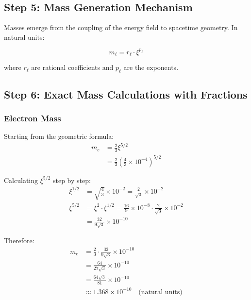 \documentclass[12pt,a4paper]{article}
\newcommand{\xipar}{\xi}  %
\begin{document}
	\subsection{Step 5: Mass Generation Mechanism}
	
	Masses emerge from the coupling of the energy field to spacetime geometry. In natural units:
	
	\begin{equation}
		m_{\ell} = r_{\ell} \cdot \xipar^{p_{\ell}}
	\end{equation}
	
	where $r_{\ell}$ are rational coefficients and $p_{\ell}$ are the exponents.
	
	\subsection{Step 6: Exact Mass Calculations with Fractions}
	
	\subsubsection{Electron Mass}
	
	\begin{keyresult}
		Starting from the geometric formula:
		\begin{align}
			m_e &= \frac{2}{3} \xipar^{5/2} \\
			&= \frac{2}{3} \left(\frac{4}{3} \times 10^{-4}\right)^{5/2}
		\end{align}
		
		Calculating $\xipar^{5/2}$ step by step:
		\begin{align}
			\xipar^{1/2} &= \sqrt{\frac{4}{3}} \times 10^{-2} = \frac{2}{\sqrt{3}} \times 10^{-2} \\
			\xipar^{5/2} &= \xipar^2 \cdot \xipar^{1/2} = \frac{16}{9} \times 10^{-8} \cdot \frac{2}{\sqrt{3}} \times 10^{-2} \\
			&= \frac{32}{9\sqrt{3}} \times 10^{-10}
		\end{align}
		
		Therefore:
		\begin{align}
			m_e &= \frac{2}{3} \cdot \frac{32}{9\sqrt{3}} \times 10^{-10} \\
			&= \frac{64}{27\sqrt{3}} \times 10^{-10} \\
			&= \frac{64\sqrt{3}}{81} \times 10^{-10} \\
			&\approx 1.368 \times 10^{-10} \quad \text{(natural units)}
		\end{align}
	\end{keyresult}
	
\end{document}
